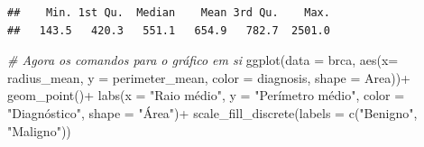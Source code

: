 \documentclass[
]{book}
\newenvironment{Shaded}{\begin{snugshade}}{\end{snugshade}}
\newcommand{\AttributeTok}[1]{\textcolor[rgb]{0.77,0.63,0.00}{#1}}
\newcommand{\CommentTok}[1]{\textcolor[rgb]{0.56,0.35,0.01}{\textit{#1}}}
\newcommand{\DecValTok}[1]{\textcolor[rgb]{0.00,0.00,0.81}{#1}}
\newcommand{\FunctionTok}[1]{\textcolor[rgb]{0.00,0.00,0.00}{#1}}
\newcommand{\NormalTok}[1]{#1}
\newcommand{\OtherTok}[1]{\textcolor[rgb]{0.56,0.35,0.01}{#1}}
\newcommand{\SpecialCharTok}[1]{\textcolor[rgb]{0.00,0.00,0.00}{#1}}
\newcommand{\StringTok}[1]{\textcolor[rgb]{0.31,0.60,0.02}{#1}}
\begin{document}
\begin{verbatim}
##    Min. 1st Qu.  Median    Mean 3rd Qu.    Max. 
##   143.5   420.3   551.1   654.9   782.7  2501.0
\end{verbatim}

\begin{Shaded}
\end{Shaded}

\begin{Shaded}
\begin{Highlighting}[]
\CommentTok{\# Agora os comandos para o gráfico em si}
\FunctionTok{ggplot}\NormalTok{(}\AttributeTok{data =}\NormalTok{ brca,}
       \FunctionTok{aes}\NormalTok{(}\AttributeTok{x=}\NormalTok{ radius\_mean, }\AttributeTok{y =}\NormalTok{ perimeter\_mean,}
           \AttributeTok{color =}\NormalTok{ diagnosis, }\AttributeTok{shape =}\NormalTok{ Area))}\SpecialCharTok{+}
  \FunctionTok{geom\_point}\NormalTok{()}\SpecialCharTok{+}
  \FunctionTok{labs}\NormalTok{(}\AttributeTok{x =} \StringTok{"Raio médio"}\NormalTok{,}
       \AttributeTok{y =} \StringTok{"Perímetro médio"}\NormalTok{,}
       \AttributeTok{color =} \StringTok{"Diagnóstico"}\NormalTok{,}
       \AttributeTok{shape =} \StringTok{"Área"}\NormalTok{)}\SpecialCharTok{+}
  \FunctionTok{scale\_fill\_discrete}\NormalTok{(}\AttributeTok{labels =} \FunctionTok{c}\NormalTok{(}\StringTok{"Benigno"}\NormalTok{, }\StringTok{"Maligno"}\NormalTok{))}
\end{Highlighting}
\end{Shaded}
\end{document}
